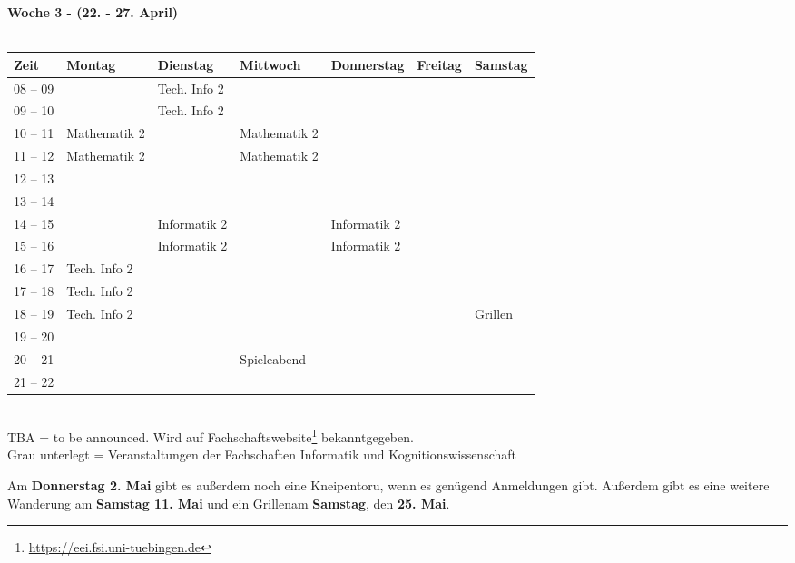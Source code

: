 \textbf{Woche 3 - (22. - 27. April)}\\
\\
\begin{tabular}{|l|p{}|p{}|p{}|p{}|p{}|p{}|} \hline
 Zeit & Montag & Dienstag & Mittwoch & Donnerstag & Freitag & Samstag \\ \hline \hline
 08 -- 09 & &\footnotesize{Tech. Info 2} & & & &\\ \cline{1-1}
 09 -- 10 & &\footnotesize{Tech. Info 2} & & & &  \\ \cline{1-1}
 10 -- 11 &\footnotesize{Mathematik 2} & &\footnotesize{Mathematik 2} & & & \\ \cline{1-1}
 11 -- 12 &\footnotesize{Mathematik 2} & &\footnotesize{Mathematik 2} & & &\\ \cline{1-1}
 12 -- 13 & & & & & & \\ \cline{1-1} 
 13 -- 14 & & & & & &  \\ \cline{1-1}
 14 -- 15 & &\footnotesize{Informatik 2} & &\footnotesize{Informatik 2} & &  \\ \cline{1-1}
 15 -- 16 & &\footnotesize{Informatik 2} & &\footnotesize{Informatik 2} & & \\ \cline {1-1}
 16 -- 17 & \footnotesize{Tech. Info 2}& & & & & \\ \cline{1-1}
 17 -- 18 &\footnotesize{Tech. Info 2} & & & & & \\ \cline{1-1}
 18 -- 19 &\footnotesize{Tech. Info 2} & & & & &\cellcolor{lightlightgray} \footnotesize{Grillen}  \\ \cline{1-1}
 19 -- 20 & & & & & &\cellcolor{lightlightgray} \\ \cline{1-1}
 20 -- 21 & & &\cellcolor{lightlightgray} \footnotesize{Spieleabend} & & &\cellcolor{lightlightgray} \\ \cline{1-1}
 21 -- 22 & & &\cellcolor{lightlightgray} & & &\cellcolor{lightlightgray} \\ \hline
\end{tabular}
\\
{\scriptsize TBA = to be announced. Wird auf Fachschaftswebsite\footnote{\url{https://eei.fsi.uni-tuebingen.de}}  bekanntgegeben.} \\
{\scriptsize Grau unterlegt = Veranstaltungen der Fachschaften Informatik und Kognitionswissenschaft }

\normalsize
Am \textbf{Donnerstag 2. Mai} gibt es außerdem noch eine Kneipentoru, wenn es genügend Anmeldungen gibt. Außerdem gibt es eine weitere Wanderung am \textbf{Samstag 11. Mai} und ein Grillenam \textbf{Samstag}, den \textbf{25. Mai}.

\newpage
\normalsize

